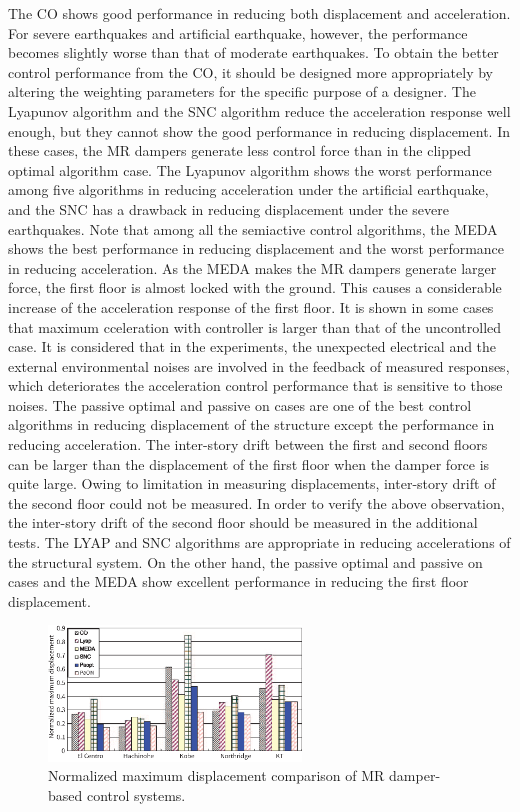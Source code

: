 The CO shows good performance in reducing both displacement and acceleration. For severe earthquakes and artificial earthquake, however, the performance becomes slightly worse than that of moderate earthquakes. To obtain the better control performance from the CO, it should be designed more appropriately by altering the weighting parameters for the specific purpose of a designer. The Lyapunov algorithm and the SNC algorithm reduce the acceleration response well enough, but they cannot show the good performance in reducing displacement. In these cases, the MR dampers generate less control force than in the clipped optimal algorithm case. The Lyapunov algorithm shows the worst performance among five algorithms in reducing acceleration under the artificial earthquake, and the SNC has a drawback in reducing displacement under the severe earthquakes.
Note that among all the semiactive control algorithms, the MEDA shows the best performance in reducing displacement and the worst performance in reducing acceleration. As the MEDA makes the MR dampers generate larger force, the first floor is almost locked with the ground. This causes a considerable increase of the acceleration response of the first floor.
It is shown in some cases that maximum cceleration with controller is larger than that of the uncontrolled case. It is considered that in the experiments, the unexpected electrical and the external environmental noises are involved in the feedback of measured responses, which deteriorates the acceleration control performance that is sensitive to those noises. The passive optimal and passive on cases are one of the best control algorithms in reducing displacement of the structure except the performance in reducing acceleration.
The inter-story drift between the first and second floors can be larger than the displacement of the first floor when the damper force is quite large. Owing to limitation in measuring displacements, inter-story drift of the second floor could not be measured. In order to verify the above observation, the inter-story drift of the second floor should be measured in the additional tests. The LYAP and SNC algorithms are appropriate in reducing accelerations of the structural system. On the other hand, the passive optimal and passive on cases and the MEDA show excellent performance in reducing the first floor displacement.

\begin{figure}[!ht]
\centering
\includegraphics[width=0.6\textwidth] {figure/n3-14.eps}
\caption{Normalized maximum displacement comparison of MR damper-based control systems.}
\label{fig:n3-14}
\end{figure}

